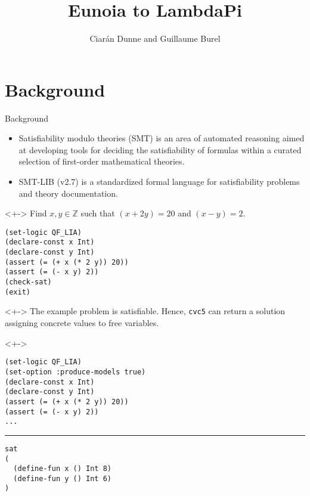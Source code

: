 \documentclass[lualatex, 12pt, handout]{beamer}
\title{Eunoia to LambdaPi}
\author{Ciarán Dunne and Guillaume Burel}
\institute{ENS Paris-Saclay, INRIA}
\begin{document}
\frame[plain]{\titlepage}

\section{Background}

\begin{frame}{Background}
	\begin{itemize}
		\item<+-> \alert{Satisfiability modulo theories} (SMT)
		      is an area of automated reasoning aimed at
		      developing tools for deciding the satisfiability
		      of formulas within a curated selection of
		      first-order mathematical theories.
		\item<+-> \alert{SMT-LIB} (v2.7) is a standardized
		      formal language for satisfiability problems
		      and theory documentation.
	\end{itemize}
	\begin{uncoverenv}<+->
		\exxample
		Find $x,y ∈ ℤ$ such that $(x + 2y) = 20$ and $(x - y) = 2$.
		\begin{lstlisting}
(set-logic QF_LIA)
(declare-const x Int)
(declare-const y Int)
(assert (= (+ x (* 2 y)) 20))
(assert (= (- x y) 2))
(check-sat)
(exit)\end{lstlisting}
	\end{uncoverenv}
\end{frame}

\begin{frame}
	\begin{uncoverenv}<+->
		\exxample
		The example problem is \alert{satisfiable}.
		Hence, \texttt{cvc5} can return a \alert{solution}
		assigning concrete values to free variables.
	\end{uncoverenv}
	\begin{uncoverenv}<+->
		\begin{lstlisting}
(set-logic QF_LIA)
(set-option :produce-models true)
(declare-const x Int)
(declare-const y Int)
(assert (= (+ x (* 2 y)) 20))
(assert (= (- x y) 2))
...\end{lstlisting}
		\hrule
		\begin{lstlisting}
sat
(
  (define-fun x () Int 8)
  (define-fun y () Int 6)
)\end{lstlisting}
	\end{uncoverenv}
\end{frame}
\end{document}
